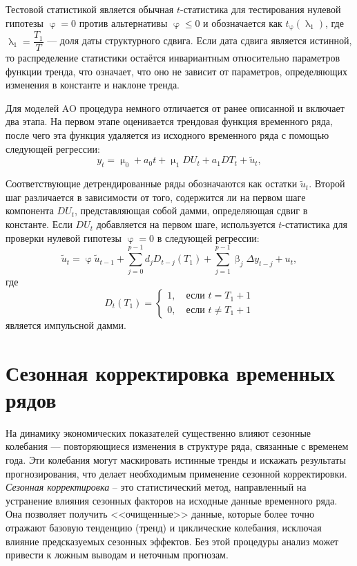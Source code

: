 \documentclass[a4paper, 14pt]{extreport}
\numberwithin{equation}{subsection}
\renewcommand{\leq}{\leqslant}
\renewcommand{\beta}{\upbeta}
\renewcommand{\varphi}{\upvarphi}
\renewcommand{\lambda}{\uplambda}
\renewcommand{\mu}{\upmu}
\numberwithin{equation}{section}
\begin{document}
	Тестовой статистикой является обычная $t$-статистика для тестирования нулевой гипотезы $\varphi=0$ против альтернативы $\varphi\leq0$ и обозначается как $t_\varphi(\lambda_1)$, где $\lambda_1=\dfrac{T_1}T$ --- доля даты структурного сдвига. Если дата сдвига является истинной, то распределение статистики остаётся инвариантным относительно параметров функции тренда, что означает, что оно не зависит от параметров, определяющих изменения в константе и наклоне тренда.
	
	Для моделей AO процедура немного отличается от ранее описанной и включает два этапа. На первом этапе оценивается трендовая функция временного ряда, после чего эта функция удаляется из исходного временного ряда с помощью следующей регрессии:
	\begin{equation}
		y_t=\mu_0+a_0t+\mu_1DU_t+a_1DT_t+\widetilde{u}_t,
	\end{equation}
	
	Соответствующие детрендированные ряды обозначаются как остатки $\widetilde{u}_t$. Второй шаг различается в зависимости от того, содержится ли на первом шаге компонента $DU_t$, представляющая собой дамми, определяющая сдвиг в константе. Если $DU_t$ добавляется на первом шаге, используется $t$-статистика для проверки нулевой гипотезы $\varphi=0$ в следующей регрессии:
	\begin{equation}
		\widetilde{u}_t=\varphi \widetilde{u}_{t-1}+\sum\limits_{j=0}^{p-1}d_jD_{t-j}(T_1)+\sum\limits_{j=1}^{p-1}\beta_j\Delta y_{t-j}+u_t,
	\end{equation}
	где $$D_t(T_1)=\begin{cases}1, \quad\text{если } t= T_1+1\\
		0,\quad\text{если } t\neq T_1+1\end{cases}$$
	является импульсной дамми.
	
	\section{Сезонная корректировка временных рядов}
	На динамику экономических показателей существенно влияют сезонные колебания --- повторяющиеся изменения в структуре ряда, связанные с временем года. Эти колебания могут маскировать истинные тренды и искажать результаты прогнозирования, что делает необходимым применение сезонной корректировки. \textit{Сезонная корректировка} -- это статистический метод, направленный на устранение влияния сезонных факторов на исходные данные временного ряда. Она позволяет получить <<очищенные>> данные, которые более точно отражают базовую тенденцию (тренд) и циклические колебания, исключая влияние предсказуемых сезонных эффектов. Без этой процедуры анализ может привести к ложным выводам и неточным прогнозам.
	
\end{document}
